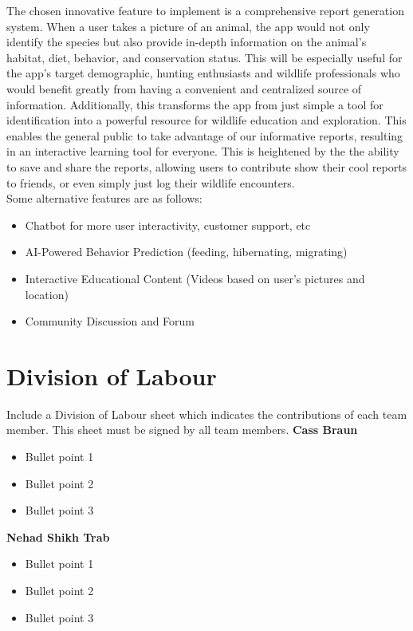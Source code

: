 \documentclass[]{article}
\begin{document}
The chosen innovative feature to implement is a comprehensive report generation system. 
When a user takes a picture of an animal, the app would not only identify the species but also provide in-depth information on the animal’s habitat, diet, behavior, and conservation status. This will be especially useful for the app's target demographic, hunting enthusiasts and wildlife professionals who would benefit greatly from having a convenient and centralized source of information. Additionally, this transforms the app from just simple a tool for identification into a powerful resource for wildlife education and exploration. This enables the general public to take advantage of our informative reports, resulting in an interactive learning tool for everyone. This is heightened by the the ability to save and share the reports, allowing users to contribute show their cool reports to friends, or even simply just log their wildlife encounters. \\

Some alternative features are as follows: 
\begin{itemize}
\item Chatbot for more user interactivity, customer support, etc
\item AI-Powered Behavior Prediction (feeding, hibernating, migrating)
\item Interactive Educational Content (Videos based on user's pictures and location)
\item Community Discussion and Forum

\end{itemize}


\appendix
\newpage
\section{Division of Labour}
\label{sec:division_of_labour}
Include a Division of Labour sheet which indicates the contributions of each team member. This sheet must be signed by all team members.
\newline
\newline
\textbf{Cass Braun}
\begin{itemize}
    \setlength\itemindent{2em}
\item Bullet point 1
\item Bullet point 2
\item Bullet point 3
\end{itemize}

\textbf{Nehad Shikh Trab}
\begin{itemize}
    \setlength\itemindent{2em}
\item Bullet point 1
\item Bullet point 2
\item Bullet point 3
\end{itemize}
\end{document}

